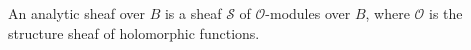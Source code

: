 An analytic sheaf over $B$ is a sheaf $\mathcal{S}$ of $\mathcal{O}$-modules over $B$, where $\mathcal{O}$ is the structure sheaf of holomorphic functions.
